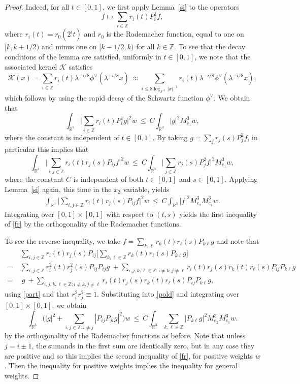\documentclass[11pt]{amsart}
\theoremstyle{definition}
\theoremstyle{remark}
\begin{document}
\begin{proof}
Indeed, for all $t\in[0,1]$, we first apply  Lemma~\ref{si}  to the
operators $$f\mapsto\sum_{i\in\mathbb{Z}}r_i(t)P_{i}^1f,$$ where
$r_i(t)=r_0(2^i t)$ and $r_0$ is the Rademacher function, equal to
one on $[k,k+1/2)$ and minus one on $[k-1/2,k)$ for all $k\in
\mathbb{Z}$. To see that the decay conditions of the lemma are
satisfied, uniformly in $t\in [0,1]$, we note that the associated
kernel $\mathcal{K}$ satisfies
$$
\mathcal{K}(x)=\sum_{i\in\mathbb{Z}}
r_i(t){\lambda}^{-i/8}\phi^\vee({\lambda}^{-i/8}x)\ \approx \sum_{i{\leqslant} 8\log_{{\lambda}^{-1}}
|x|^{-1}} r_i(t){\lambda}^{-i/8}\phi^\vee({\lambda}^{-i/8}x),
$$
which follows by using the rapid decay of the Schwartz function $\phi^\vee$.
We obtain that
$$
\int_{\mathbb{R}^3}  \Big|\sum_{i\in\mathbb{Z}}r_i(t)P_{i}^1g\Big|^2 w \ {\leqslant} \  C\!\int_{\mathbb{R}^3}  |g|^2 M^3_{e_1}w,
$$
where the constant is independent of $t\in[0,1]$.
By taking $g=\sum_{j} r_j(s) P^2_{j}f$, in particular this implies that
$$
\int_{\mathbb{R}^3}  \Big|\sum_{i,j\in\mathbb{Z}}r_i(t)r_j(s)P_{ij}f\Big|^2 w\ {\leqslant} \  C\!\int_{\mathbb{R}^3}  \Big|\sum_{j\in\mathbb{Z}}r_j(s)P^2_{j}f\Big|^2 M^3_{e_1}w,
$$
where the constant $C$ is independent of both $t\in[0,1]$ and $s\in[0,1]$.
Applying Lemma~\ref{si} again, this time in the $x_2$ variable, yields
\begin{align}\label{pold}
\int_{\mathbb{R}^3}  \Big|\sum_{i,j\in\mathbb{Z}}r_i(t)r_j(s)P_{ij}f\Big|^2 w \ {\leqslant} \  C\! \int_{\mathbb{R}^3}  |f|^2 M^3_{e_2}M^3_{e_1}w.
\end{align}
Integrating over $[0,1]\times[0,1]$ with respect to $(t,s)$ yields the first inequality of \eqref{fr} by the orthogonality of the Rademacher functions.

To see the reverse inequality, we take $f=\sum_{k,\ell}r_k(t)r_\ell(s)P_{k\ell}g$ and note that
\begin{align*}
&\sum_{i,j\in\mathbb{Z}}r_i(t)r_j(s)P_{ij}\Big[\sum_{k,\ell\in\mathbb{Z}}r_k(t)r_\ell(s)P_{k\ell}g\Big]\\
=\ &\sum_{i,j\in\mathbb{Z}}r^2_i(t)r^2_j(s) P_{ij}P_{ij} g\ +\sum_{i,j,k,\ell\in\mathbb{Z} : i\neq k,j\neq \ell}r_i(t)r_j(s)r_{k}(t)r_{\ell}(s) P_{ij}P_{k\ell} g\\
=\ & \ g\ +\sum_{i,j,k,\ell\in\mathbb{Z} : i\neq k,j\neq \ell}r_i(t)r_j(s)r_{k}(t)r_{\ell}(s) P_{ij}P_{k\ell} g,
\end{align*}
using \eqref{part} and that $r^2_ir^2_j\equiv1$.  Substituting into
\eqref{pold} and integrating over $[0,1]\times[0,1]$, we obtain 
$$
\int_{\mathbb{R}^3}\Big(|g|^2+\sum_{i,j\in\mathbb{Z}: i\neq j}|P_{ij}P_{ji}g|^2 \Big)w\ {\leqslant} \  C\! \int_{\mathbb{R}^3}   \sum_{k,\ell\in\mathbb{Z}} |P_{k\ell}g|^2M^3_{e_2}M^3_{e_1}w.
$$
by the orthogonality of the Rademacher functions as before. Note that unless $j=i\pm 1$, the sumands in the first sum are identically zero, but in any case they are positive and so this implies 
the second inequality of \eqref{fr}, for positive weights $w$. Then the inequality for positive weights implies the inequality for general weights.


\end{proof}
\end{document}
